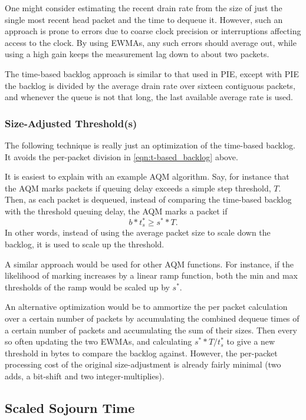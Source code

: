 One might consider estimating the recent drain rate from the size of just the single most recent head packet and the time to dequeue it. However, such an approach is prone to errors due to coarse clock precision or interruptions affecting access to the clock. By using EWMAs, any such errors should average out, while using a high gain keeps the measurement lag down to about two packets.

The time-based backlog approach is similar to that used in PIE, except with PIE the backlog is divided by the average drain rate over sixteen contiguous packets, and whenever the queue is not that long, the last available average rate is used.

\subsubsection{Size-Adjusted Threshold(s)}\label{sec:time-adj_thresh}

The following technique is really just an optimization of the time-based backlog. It avoids the per-packet division in \autoref{eqn:t-based_backlog} above.

It is easiest to explain with an example AQM algorithm. Say, for instance that the AQM marks packets if queuing delay exceeds a simple step threshold, \(T\). Then, as each packet is dequeued, instead of comparing the time-based backlog with the threshold queuing delay, the AQM marks a packet if
\begin{equation}
	b * t_s^* \ge s^* * T.
\end{equation}
In other words, instead of using the average packet size to scale down the backlog, it is used to scale up the threshold.

A similar approach would be used for other AQM functions. For instance, if the likelihood of marking increases by a linear ramp function, both the min and max thresholds of the ramp would be scaled up by \(s^*\).

An alternative optimization would be to ammortize the per packet calculation over a certain number of packets by accumulating the combined dequeue times of a certain number of packets and accumulating the sum of their sizes. Then every so often updating the two EWMAs, and calculating \(s^* * T / t_s^*\) to give a new threshold in bytes to compare the backlog against. However, the per-packet processing cost of the original size-adjustment is already fairly minimal (two adds, a bit-shift and two integer-multiplies).

\subsection{Scaled Sojourn Time}\label{sec:scaled_svc_time}

